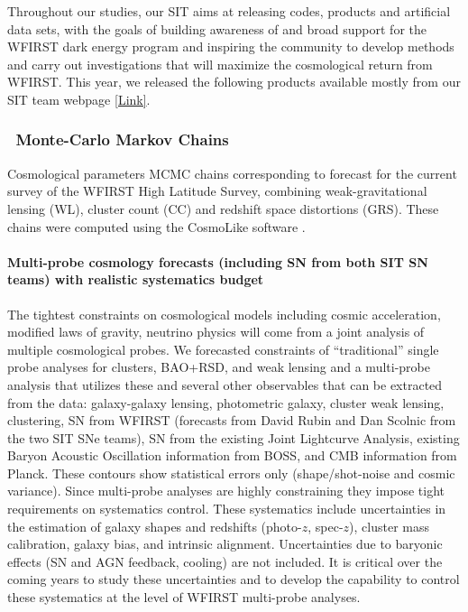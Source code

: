 Throughout our studies, our SIT aims at releasing codes, products and artificial data sets, with the goals of building awareness of and broad support for the WFIRST dark energy program and inspiring the community to develop methods and carry out investigations that will maximize the cosmological return from WFIRST. This year, we released the following products available mostly from our SIT team webpage \href{http://www.wfirst-hls-cosmology.org/products/}{[Link]}.

\subsubsection{\CoLi\ Monte-Carlo Markov Chains}

Cosmological parameters MCMC chains corresponding to forecast for the current survey of the WFIRST High Latitude Survey, combining weak-gravitational lensing (WL), cluster count (CC) and redshift space distortions (GRS). These chains were computed using the CosmoLike software \citep{Krause:2016jvl}.

\paragraph{Multi-probe cosmology forecasts (including SN from both SIT SN teams) with realistic systematics budget} The tightest constraints on cosmological models including cosmic acceleration, modified laws of gravity, neutrino physics will come from a joint analysis of multiple cosmological probes. We forecasted constraints of “traditional” single probe analyses for clusters, BAO+RSD, and weak lensing and a multi-probe analysis that utilizes these and several other observables that can be extracted from the data: galaxy-galaxy lensing, photometric galaxy, cluster weak lensing, clustering, SN from WFIRST (forecasts from David Rubin and Dan Scolnic from the two SIT SNe teams), SN from the existing Joint Lightcurve Analysis, existing Baryon Acoustic Oscillation information from BOSS, and CMB information from Planck. These contours show statistical errors only (shape/shot-noise and cosmic variance). Since multi-probe analyses are highly constraining they impose tight requirements on systematics control. These systematics include uncertainties in the estimation of galaxy shapes and redshifts (photo-$z$, spec-$z$), cluster mass calibration, galaxy bias, and intrinsic alignment. Uncertainties due to baryonic effects (SN and AGN feedback, cooling) are not included. It is critical over the coming years to study these uncertainties and to develop the capability to control these systematics at the level of WFIRST multi-probe analyses.

